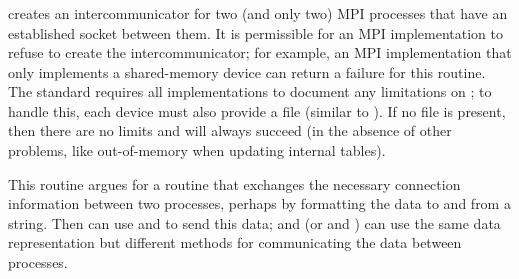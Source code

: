 \documentclass{article}
\begin{document}
\subsubsection{}
 creates an intercommunicator for two (and only two)
MPI processes that have an established socket between them.  It is permissible
for an MPI implementation to refuse to create the intercommunicator; for
example, an MPI implementation that only implements a shared-memory device can
return a failure for this routine.  The standard requires all implementations
to document any limitations on ; to handle this, each
device must also provide a file  (similar to
).  If no file is present, then there are no limits
and  will always succeed (in the absence of other
problems, like out-of-memory when updating internal tables).

This routine argues for a routine that exchanges the necessary connection
information between two processes, perhaps by formatting the data to and from
a string.  Then  can use  and 
to send this data;  and 
(or  and ) can use the same data
representation but different methods for communicating the data between
processes.  

\subsubsection{}
\end{document}
